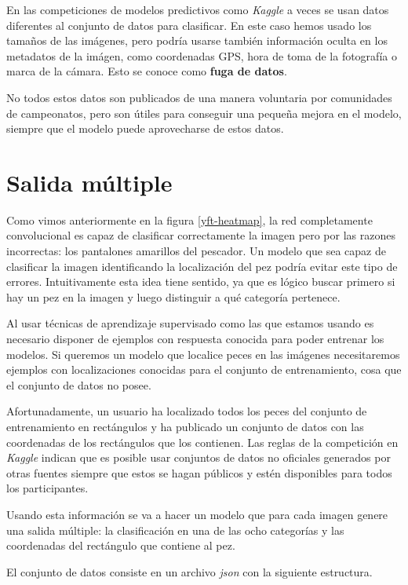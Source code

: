 En las competiciones de modelos predictivos como \textit{Kaggle} a veces se usan datos diferentes al conjunto de datos para clasificar. En este caso hemos usado los tamaños de las imágenes, pero podría usarse también información oculta en los metadatos de la imágen, como coordenadas GPS, hora de toma de la fotografía o marca de la cámara. Esto se conoce como \textbf{fuga de datos}.

No todos estos datos son publicados de una manera voluntaria por comunidades de campeonatos, pero son útiles para conseguir una pequeña mejora en el modelo, siempre que el modelo puede aprovecharse de estos datos.

\section{Salida múltiple}

Como vimos anteriormente en la figura \ref{yft-heatmap}, la red completamente
convolucional es capaz de clasificar correctamente la imagen pero por las
razones incorrectas: los pantalones amarillos del pescador. Un modelo que sea
capaz de clasificar la imagen identificando la localización del pez podría
evitar este tipo de errores. Intuitivamente esta idea tiene sentido, ya que es lógico
buscar primero si hay un pez en la imagen y luego distinguir a qué categoría
pertenece.

Al usar técnicas de aprendizaje supervisado como las que estamos usando es
necesario disponer de ejemplos con respuesta conocida para poder entrenar los
modelos. Si queremos un modelo que localice peces en las imágenes necesitaremos
ejemplos con localizaciones conocidas para el conjunto de entrenamiento, cosa
que el conjunto de datos no posee.

Afortunadamente, un usuario ha localizado todos los peces del conjunto de
entrenamiento en rectángulos y ha publicado un conjunto de datos con las
coordenadas de los rectángulos que los contienen. Las reglas de la competición
en \textit{Kaggle} indican que es posible usar conjuntos de datos no oficiales
generados por otras fuentes siempre que estos se hagan públicos y estén
disponibles para todos los participantes.

Usando esta información se va a hacer un modelo que para cada imagen genere una
salida múltiple: la clasificación en una de las ocho categorías y las
coordenadas del rectángulo que contiene al pez.

El conjunto de datos consiste en un archivo \textit{json} con la siguiente estructura.

